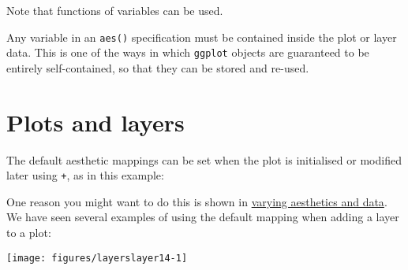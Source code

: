 Note that functions of variables can be used.

Any variable in an \texttt{aes()} specification must be contained inside
the plot or layer data. This is one of the ways in which \texttt{ggplot}
objects are guaranteed to be entirely self-contained, so that they can
be stored and re-used.

\section{Plots and layers}\label{sub:plots-and-layers}

The default aesthetic mappings can be set when the plot is initialised
or modified later using \texttt{+}, as in this example:
 \indexc{+}

\begin{Shaded}
\begin{Highlighting}[]
\NormalTok{>}\StringTok{ }\StringTok{ }
\NormalTok{>}\StringTok{ }
\NormalTok{>}\StringTok{ }
\ErrorTok{>}\StringTok{ }\StringTok{ }\StringTok{ }
\NormalTok{>}\StringTok{ }
\end{Highlighting}
\end{Shaded}

One reason you might want to do this is shown in
\hyperref[sub:different-aesthetics]{varying aesthetics and data}. We
have seen several examples of using the default mapping when adding a
layer to a plot:

\begin{Shaded}
\begin{Highlighting}[]
\NormalTok{>}\StringTok{ }\StringTok{ }\NormalTok{(}  
\NormalTok{>}\StringTok{ }\StringTok{ }\NormalTok{()}
\end{Highlighting}
\end{Shaded}

\begin{flushleft}\texttt{[image: figures/layerslayer14-1]} \end{flushleft}

